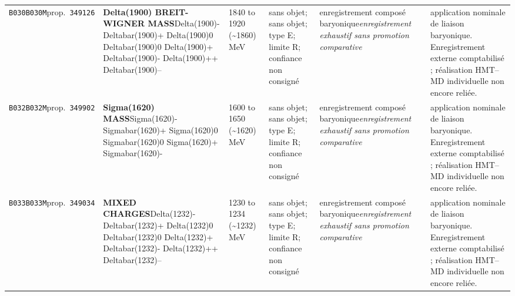 \begin{landscape}
\begin{longtable}{L{1.85cm}L{4.45cm}L{2.35cm}L{4.05cm}L{3.35cm}L{7.15cm}}
\texttt{B030}\newline \texttt{B030M}\newline prop.\ \texttt{349126} & \textbf{Delta(1900) BREIT-WIGNER MASS}\newline Delta(1900)- \textbar{}\allowbreak{} Deltabar(1900)+ \textbar{}\allowbreak{} Delta(1900)0 \textbar{}\allowbreak{} Deltabar(1900)0 \textbar{}\allowbreak{} Delta(1900)+ \textbar{}\allowbreak{} Deltabar(1900)- \textbar{}\allowbreak{} Delta(1900)++ \textbar{}\allowbreak{} Deltabar(1900)-- & 1840 to 1920 (\textasciitilde{}1860)\,MeV & sans objet; sans objet; type E; limite R; confiance non consigné & enregistrement composé baryonique\newline \emph{enregistrement exhaustif sans promotion comparative} & application nominale de liaison baryonique. Enregistrement externe comptabilisé ; réalisation HMT--MD individuelle non encore reliée. \\
\texttt{B032}\newline \texttt{B032M}\newline prop.\ \texttt{349902} & \textbf{Sigma(1620) MASS}\newline Sigma(1620)- \textbar{}\allowbreak{} Sigmabar(1620)+ \textbar{}\allowbreak{} Sigma(1620)0 \textbar{}\allowbreak{} Sigmabar(1620)0 \textbar{}\allowbreak{} Sigma(1620)+ \textbar{}\allowbreak{} Sigmabar(1620)- & 1600 to 1650 (\textasciitilde{}1620)\,MeV & sans objet; sans objet; type E; limite R; confiance non consigné & enregistrement composé baryonique\newline \emph{enregistrement exhaustif sans promotion comparative} & application nominale de liaison baryonique. Enregistrement externe comptabilisé ; réalisation HMT--MD individuelle non encore reliée. \\
\texttt{B033}\newline \texttt{B033M}\newline prop.\ \texttt{349034} & \textbf{MIXED CHARGES}\newline Delta(1232)- \textbar{}\allowbreak{} Deltabar(1232)+ \textbar{}\allowbreak{} Delta(1232)0 \textbar{}\allowbreak{} Deltabar(1232)0 \textbar{}\allowbreak{} Delta(1232)+ \textbar{}\allowbreak{} Deltabar(1232)- \textbar{}\allowbreak{} Delta(1232)++ \textbar{}\allowbreak{} Deltabar(1232)-- & 1230 to 1234 (\textasciitilde{}1232)\,MeV & sans objet; sans objet; type E; limite R; confiance non consigné & enregistrement composé baryonique\newline \emph{enregistrement exhaustif sans promotion comparative} & application nominale de liaison baryonique. Enregistrement externe comptabilisé ; réalisation HMT--MD individuelle non encore reliée. \\

\end{longtable}
\end{landscape}
